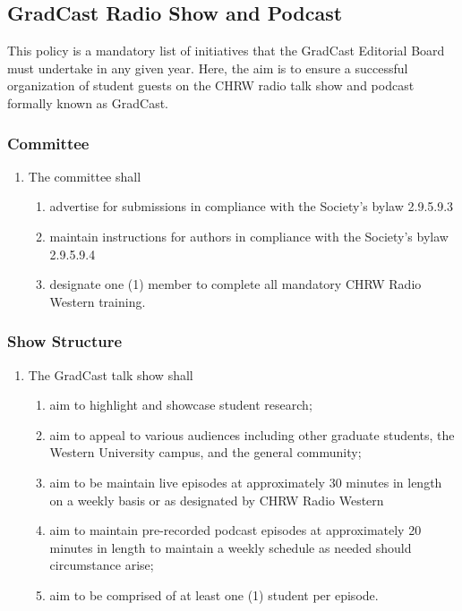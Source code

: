 \subsection{GradCast Radio Show and Podcast}
This policy is a mandatory list of initiatives that the GradCast Editorial Board must undertake in any given year. Here, the aim is to ensure a successful organization of student guests on the CHRW radio talk show and podcast formally known as GradCast.

\subsubsection{Committee} 
\begin{enumerate} [label*=\arabic*., align=left]	
\item The committee shall
\begin{enumerate} [label*=\arabic*., align=left]	
\item advertise for submissions in compliance with the Society's bylaw 2.9.5.9.3
\item maintain instructions for authors in compliance with the Society's bylaw 2.9.5.9.4
\item designate one (1) member to complete all mandatory CHRW Radio Western training.
\end{enumerate}
\end{enumerate}

\subsubsection{Show Structure}
\begin{enumerate} [label*=\arabic*., align=left]	
\item The GradCast talk show shall
\begin{enumerate} [label*=\arabic*., align=left]	
\item aim to highlight and showcase student research;
\item aim to appeal to various audiences including other graduate students, the Western University campus, and the general community;
\item aim to be maintain live episodes at approximately 30 minutes in length on a weekly basis or as designated by CHRW Radio Western
\item aim to maintain pre-recorded podcast episodes at approximately 20 minutes in length to maintain a weekly schedule as needed should circumstance arise;
\item aim to be comprised of at least one (1) student per episode.
\end{enumerate}
\end{enumerate}

